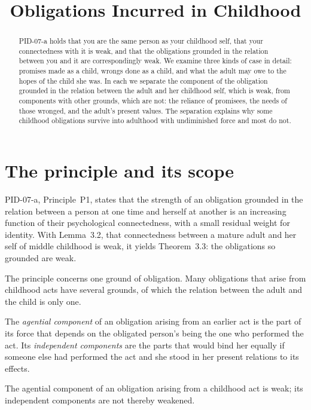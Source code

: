 \documentclass{situationist-preprint}
\title{Obligations Incurred in Childhood}
\begin{document}
\maketitle

\begin{abstract}
PID-07-a holds that you are the same person as your childhood self, that your connectedness with it is weak, and that the obligations grounded in the relation between you and it are correspondingly weak. We examine three kinds of case in detail: promises made as a child, wrongs done as a child, and what the adult may owe to the hopes of the child she was. In each we separate the component of the obligation grounded in the relation between the adult and her childhood self, which is weak, from components with other grounds, which are not: the reliance of promisees, the needs of those wronged, and the adult's present values. The separation explains why some childhood obligations survive into adulthood with undiminished force and most do not.
\end{abstract}

\section{The principle and its scope}

PID-07-a, Principle~P1, states that the strength of an obligation grounded in the relation between a person at one time and herself at another is an increasing function of their psychological connectedness, with a small residual weight for identity. With Lemma~3.2, that connectedness between a mature adult and her self of middle childhood is weak, it yields Theorem~3.3: the obligations so grounded are weak.

The principle concerns one ground of obligation. Many obligations that arise from childhood acts have several grounds, of which the relation between the adult and the child is only one.

\begin{definition}\label{d:comp}
The \emph{agential component} of an obligation arising from an earlier act is the part of its force that depends on the obligated person's being the one who performed the act. Its \emph{independent components} are the parts that would bind her equally if someone else had performed the act and she stood in her present relations to its effects.
\end{definition}

\begin{proposition}\label{p:split}
The agential component of an obligation arising from a childhood act is weak; its independent components are not thereby weakened.
\end{proposition}
\end{document}
